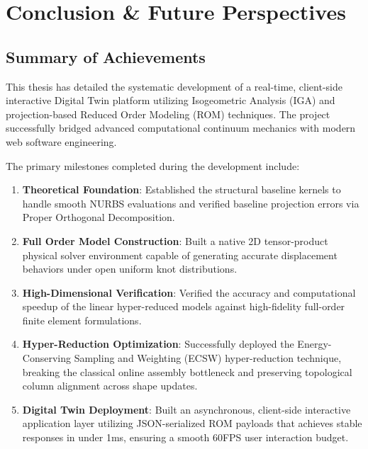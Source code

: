 \chapter{Conclusion \& Future Perspectives}
\label{ch:conclusion}

\section{Summary of Achievements}
This thesis has detailed the systematic development of a real-time, client-side interactive Digital Twin platform utilizing Isogeometric Analysis (IGA) and projection-based Reduced Order Modeling (ROM) techniques. The project successfully bridged advanced computational continuum mechanics with modern web software engineering.

The primary milestones completed during the development include:
\begin{enumerate}
    \item \textbf{Theoretical Foundation}: Established the structural baseline kernels to handle smooth NURBS evaluations and verified baseline projection errors via Proper Orthogonal Decomposition.
    \item \textbf{Full Order Model Construction}: Built a native 2D tensor-product physical solver environment capable of generating accurate displacement behaviors under open uniform knot distributions.
    \item \textbf{High-Dimensional Verification}: Verified the accuracy and computational speedup of the linear hyper-reduced models against high-fidelity full-order finite element formulations.
    \item \textbf{Hyper-Reduction Optimization}: Successfully deployed the Energy-Conserving Sampling and Weighting (ECSW) hyper-reduction technique, breaking the classical online assembly bottleneck and preserving topological column alignment across shape updates.
    \item \textbf{Digital Twin Deployment}: Built an asynchronous, client-side interactive application layer utilizing JSON-serialized ROM payloads that achieves stable responses in under 1ms, ensuring a smooth 60FPS user interaction budget.
\end{enumerate}

